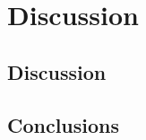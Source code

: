 \chapter{Discussion}
\label{ch:discussion}
\section{Discussion}

\section{Conclusions}
\label{sec:conclusions}
